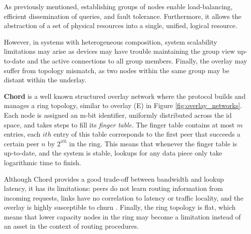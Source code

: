 As previously mentioned, establishing groups of nodes enable load-balancing, efficient dissemination of queries, and fault tolerance. Furthermore, it allows the abstraction of a set of physical resources into a single, unified, logical resource. 

However, in systems with heterogeneous composition, system scalability limitations may arise as devices may have trouble maintaining the group view up-to-date and the active connections to all group members. Finally, the overlay may suffer from topology mismatch, as two nodes within the same group may be distant within the underlay.

\textbf{Chord} \cite{stoica2003chord} is a well known structured overlay network where the protocol builds and manages a ring topology, similar to overlay (E) in Figure \ref{fig:overlay_networks}. Each node is assigned an m-bit identifier, uniformly distributed across the id space, and takes steps to fill its \textit{finger table}. The finger table contains at most \(m\) entries, each $ith$ entry of this table corresponds to the first peer that succeeds a certain peer \(n\) by \(2^{ith}\) in the ring. This means that whenever the finger table is up-to-date, and the system is stable, lookups for any data piece only take logarithmic time to finish. 

Although Chord provides a good trade-off between bandwidth and lookup latency, it has its limitations: peers do not learn routing information from incoming requests, links have no correlation to latency or traffic locality, and the overlay is highly susceptible to churn \cite{dht_performance_churn}. Finally, the ring topology is flat, which means that lower capacity nodes in the ring may become a limitation instead of an asset in the context of routing procedures.




